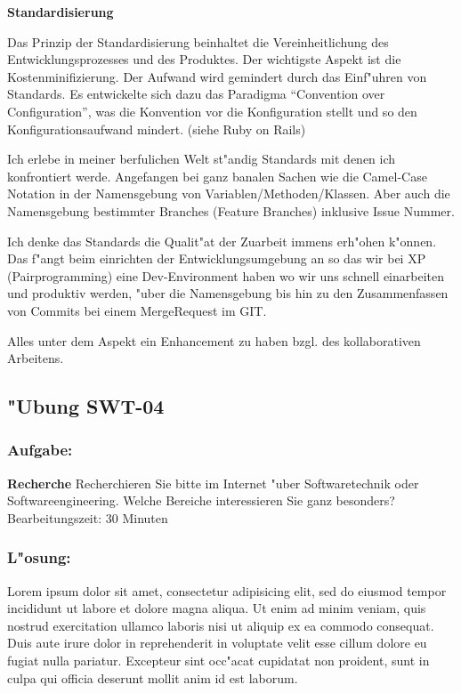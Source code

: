 \textbf{Standardisierung}

Das Prinzip der Standardisierung beinhaltet die Vereinheitlichung des Entwicklungsprozesses und des Produktes. Der wichtigste Aspekt ist die Kostenminifizierung. Der Aufwand wird gemindert durch das Einf"uhren von Standards.
Es entwickelte sich dazu das Paradigma ``Convention over Configuration'', was die Konvention vor die Konfiguration stellt und so den Konfigurationsaufwand mindert. (siehe Ruby on Rails)

Ich erlebe in meiner berfulichen Welt st"andig Standards mit denen ich konfrontiert werde.
Angefangen bei ganz banalen Sachen wie die Camel-Case Notation in der Namensgebung von Variablen/Methoden/Klassen.
Aber auch die Namensgebung bestimmter Branches (Feature Branches) inklusive Issue Nummer.

Ich denke das Standards die Qualit"at der Zuarbeit immens erh"ohen k"onnen.
Das f"angt beim einrichten der Entwicklungsumgebung an so das wir bei XP (Pairprogramming) eine Dev-Environment haben wo wir uns schnell einarbeiten und produktiv werden, "uber die Namensgebung bis hin zu den Zusammenfassen von Commits bei einem MergeRequest im GIT.

Alles unter dem Aspekt ein Enhancement zu haben bzgl. des kollaborativen Arbeitens.


\newpage
\subsection{"Ubung SWT-04}
\subsubsection*{Aufgabe:}

\begin{framed}
\textbf{Recherche}
\smallbreak
Recherchieren Sie bitte im Internet "uber Softwaretechnik oder Softwareengineering. Welche Bereiche interessieren Sie ganz besonders?
\bigbreak
\small Bearbeitungszeit: 30 Minuten
\end{framed}
\bigbreak
\bigbreak
\subsubsection*{L"osung:}
Lorem ipsum dolor sit amet, consectetur adipisicing elit, sed do eiusmod tempor incididunt ut labore et dolore magna aliqua. Ut enim ad minim veniam, quis nostrud exercitation ullamco laboris nisi ut aliquip ex ea commodo consequat. Duis aute irure dolor in reprehenderit in voluptate velit esse cillum dolore eu fugiat nulla pariatur. Excepteur sint occ"acat cupidatat non proident, sunt in culpa qui officia deserunt mollit anim id est laborum.

